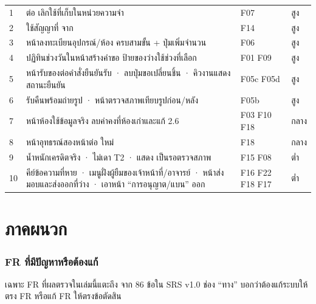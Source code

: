 \begin{table}[H]
\centering\small
\begin{tabular}{L{1cm}L{9.4cm}L{2.2cm}L{1.6cm}}
 & ต่อ    เลิกใช้ที่เก็บในหน่วยความจำ & F07 & สูง \\
2 & ใช้สัญญาที่  จาก  & F14 & สูง \\
3 & หน้าลงทะเบียนอุปกรณ์/ห้อง ครบสามขั้น + ปุ่มเพิ่มจำนวน & F06 & สูง \\
4 & ปฏิทินช่วงวันในหน้าสร้างคำขอ ป้ายของว่างใช้ช่วงที่เลือก & F01 F09 & สูง \\
5 & หน้ารับของต่อคำสั่งยืนยันรับ · ลบปุ่มขอเปลี่ยนชิ้น · คิวงานแสดงสถานะยืนยัน & F05c F05d & สูง \\
6 & รับคืนพร้อมถ่ายรูป · หน้าตรวจสภาพเทียบรูปก่อน/หลัง & F05b & สูง \\
7 & หน้าห้องใช้ข้อมูลจริง ลบค่าคงที่ห้องเก่าและแก้  2.6 & F03 F10 F18 & กลาง \\
8 & หน้าอุทธรณ์สองหน้าต่อ  ใหม่ & F18 & กลาง \\
9 & น้ำหนักเครดิตจริง · ไม่เดา T2 · แสดง  เป็นรอตรวจสภาพ & F15 F08 & ต่ำ \\
10 & คีย์ข้อความที่หาย · เมนูฝั่งผู้ยืมของเจ้าหน้าที่/อาจารย์ · หน้าส่งมอบและส่งออกที่ว่าง · เอาหน้า ``การอนุญาต/แบน'' ออก & F16 F22 F18 F17 & ต่ำ \\
\bottomrule
\end{tabular}
\end{table}

\clearpage
\appendix
\part*{ภาคผนวก}
\makeatletter
\newcommand{\thaialph}[1]{\ifcase\value{#1}\or ก\or ข\or ค\or ง\or จ\or ฉ\fi}
\makeatother
\renewcommand{\thesection}{\thaialph{section}}

\section{FR ที่มีปัญหาหรือต้องแก้}
\label{app:fr}

เฉพาะ FR ที่ผลตรวจในเล่มนี้แตะถึง จาก 86 ข้อใน SRS v1.0 ช่อง ``ทาง'' บอกว่าต้องแก้ระบบให้ตรง FR หรือแก้ FR ให้ตรงข้อตัดสิน

